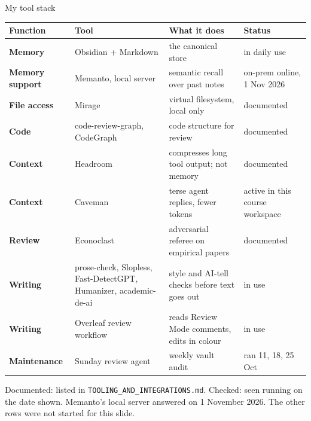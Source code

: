 \begin{frame}{My tool stack}
  \renewcommand{\arraystretch}{1.05}
  {\fontsize{6.4}{7.6}\selectfont
  \begin{tabularx}{\linewidth}{>{\bfseries\color{ink}}l l >{\leavevmode\color{dark}}X l}
  \toprule
  Function & Tool & What it does & Status\\
  \midrule
  Memory & Obsidian + Markdown & the canonical store & in daily use\\
  Memory support & Memanto, local server & semantic recall over past notes & on-prem online, 1 Nov 2026\\
  File access & Mirage & virtual filesystem, local only & documented\\
  Code & code-review-graph, CodeGraph & code structure for review & documented\\
  Context & Headroom & compresses long tool output; not memory & documented\\
  Context & Caveman & terse agent replies, fewer tokens & active in this course workspace\\
  Review & Econoclast & adversarial referee on empirical papers & documented\\
  Writing & prose-check, Slopless, Fast-DetectGPT, Humanizer, academic-de-ai & style and AI-tell checks before text goes out & in use\\
  Writing & Overleaf review workflow & reads Review Mode comments, edits in colour & in use\\
  Maintenance & Sunday review agent & weekly vault audit & ran 11, 18, 25 Oct\\
  \bottomrule
  \end{tabularx}}
  \vspace{0.3em}
  {\scriptsize\color{muted} Documented: listed in \texttt{TOOLING\_AND\_INTEGRATIONS.md}. Checked: seen running on the date shown. Memanto's local server answered on 1 November 2026. The other rows were not started for this slide.\par}
\end{frame}

